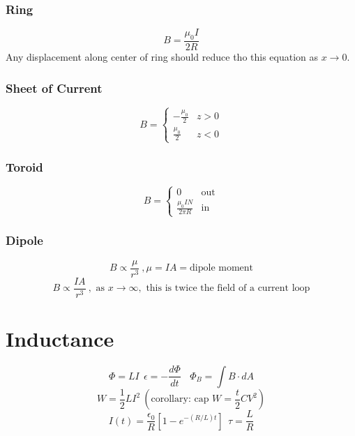 \documentclass[10pt,a4paper]{article}
\begin{document}
\subsubsection{Ring} %
\label{ssub:ring}
\begin{equation}
    B = \frac{\mu_0I}{2R}
\end{equation}
Any displacement along center of ring should reduce tho this equation as $x \rightarrow 0$.
\subsubsection{Sheet of Current} %
\label{ssub:sheet_of_current}
\[
 B =
  \begin{cases}
   - \frac{\mu_0}{2}& z > 0\\
   \frac{\mu_0}{2} & z < 0
  \end{cases}
\]
\subsubsection{Toroid} %
\label{ssub:toroid}
\[
 B =
  \begin{cases}
   0 & \textrm{out}\\
   \frac{\mu_0IN}{2\pi R}& \textrm{in}
  \end{cases}
\]

\subsubsection{Dipole} %
\label{ssub:dipole}
\begin{equation}
    B \propto \frac{\mu}{r^3}~,\mu = IA = \textrm{dipole moment}
\end{equation}
\begin{equation}
    B \propto \frac{IA}{r^3}~, \textrm{ as } x \rightarrow \infty, \textrm{ this is twice the field of a current loop}
\end{equation}

\section{Inductance} %
\label{sec:inductance}
\begin{equation}
    \Phi = LI~~ \epsilon = - \frac{d \Phi}{dt}~~~~ \Phi_B = \int B \cdot dA
\end{equation}
\begin{equation}
    W = \frac{1}{2}LI^2~\left(\textrm{corollary: cap $W = \frac{t}{2}CV^2$} \right)
\end{equation}
\begin{equation}
    I(t) = \frac{\epsilon_0}{R} \left[ 1 - e^{-(R/L)t} \right]~~\tau = \frac{L}{R}
\end{equation}
\end{document}
